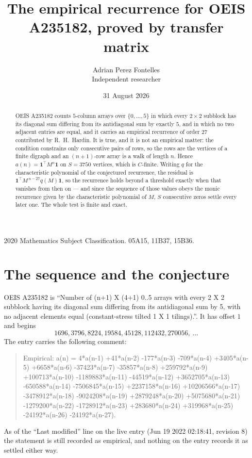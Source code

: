 \documentclass[11pt,a4paper]{article}
\title{The empirical recurrence for OEIS A235182, proved by transfer matrix}
\author{Adrian Perez Fontelles\\ \small Independent researcher}
\date{31 August 2026}
\theoremstyle{plain}
\theoremstyle{definition}
\begin{document}
\maketitle

\begin{abstract}
OEIS A235182 counts $5$-column arrays over $\{0,\dots,5\}$ in which every
$2\times2$ subblock has its diagonal sum differing from its antidiagonal sum by
exactly $5$, and in which no two adjacent entries are equal, and it
carries an empirical recurrence of order $27$ contributed by R.~H.~Hardin. It is true,
and it is not an empirical matter: the condition constrains only consecutive pairs of rows,
so the rows are the vertices of a finite digraph and an $(n+1)$-row array is a walk of
length $n$. Hence $a(n)=\mathbf{1}^{\!\top}M^{n}\mathbf{1}$ on $S=3750$ vertices, which
is $C$-finite. Writing $q$ for the characteristic polynomial of the conjectured recurrence,
the residual is $\mathbf{1}^{\!\top}M^{\,n-27}q(M)\mathbf{1}$, so the recurrence
holds beyond a threshold exactly when that vanishes from then on --- and since the sequence
of those values obeys the monic recurrence given by the characteristic polynomial of $M$,
$S$ consecutive zeros settle every later one. The whole test is finite and exact.
\end{abstract}

\noindent\small 2020 Mathematics Subject Classification. 05A15, 11B37, 15B36.\normalsize

\section{The sequence and the conjecture}

OEIS A235182 is ``Number of (n+1) X (4+1) 0..5 arrays with every 2 X 2 subblock having its diagonal sum differing from its antidiagonal sum by 5, with no adjacent elements equal (constant-stress tilted 1 X 1 tilings).''. It has offset
$1$ and begins
\[
1696, 3796, 8224, 19584, 45128, 112432, 270056,\ \dots
\]
The entry carries the following comment:
\begin{quote}\small
Empirical: a(n) = 4*a(n-1) +41*a(n-2) -177*a(n-3) -709*a(n-4) +3405*a(n-5) +6658*a(n-6) -37423*a(n-7) -35857*a(n-8) +259792*a(n-9) +100713*a(n-10) -1189883*a(n-11) -44519*a(n-12) +3652705*a(n-13) -650588*a(n-14) -7506845*a(n-15) +2237158*a(n-16) +10206566*a(n-17) -3478912*a(n-18) -9024208*a(n-19) +2879248*a(n-20) +5075680*a(n-21) -1279200*a(n-22) -1728912*a(n-23) +283680*a(n-24) +319968*a(n-25) -24192*a(n-26) -24192*a(n-27).
\end{quote}
As of the ``Last modified'' line on the live entry (Jun 19 2022 02:18:41, revision 8) the statement is
still recorded as empirical, and nothing on the entry records it as settled either way.
\end{document}
